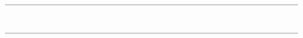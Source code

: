\begin{table}[htbp]
{\begin{tabular}{rrrrrrrrrrrrrrrrrrrrrrrrrrrrrrrrrrr}
 &  &  &  &  &  &  &  &  &  &  &  &  &  &  &  &  &  &  &  &  &  &  &  &  &  &  &  &  &  &  &  &  &  &  \\
 &  &  &  &  &  &  &  &  &  &  &  &  &  &  &  &  &  &  &  &  &  &  &  &  &  &  &  &  &  &  &  &  &  &  \\
 &  &  &  &  &  &  &  &  &  &  &  &  &  &  &  &  &  &  &  &  &  &  &  &  &  &  &  &  &  &  &  &  &  &  \\
 &  &  &  &  &  &  &  &  &  &  &  &  &  &  &  &  &  &  &  &  &  &  &  &  &  &  &  &  &  &  &  &  &  &  \\
 &  &  &  &  &  &  &  &  &  &  &  &  &  &  &  &  &  &  &  &  &  &  &  &  &  &  &  &  &  &  &  &  &  &  \\
 &  &  &  &  &  &  &  &  &  &  &  &  &  &  &  &  &  &  &  &  &  &  &  &  &  &  &  &  &  &  &  &  &  &  \\
 &  &  &  &  &  &  &  &  &  &  &  &  &  &  &  &  &  &  &  &  &  &  &  &  &  &  &  &  &  &  &  &  &  &  \\
 &  &  &  &  &  &  &  &  &  &  &  &  &  &  &  &  &  &  &  &  &  &  &  &  &  &  &  &  &  &  &  &  &  &  \\
 &  &  &  &  &  &  &  &  &  &  &  &  &  &  &  &  &  &  &  &  &  &  &  &  &  &  &  &  &  &  &  &  &  &  \\

\end{tabular}}
\end{table}
